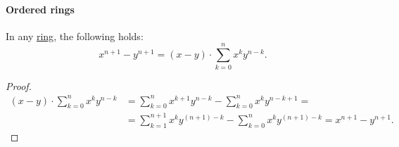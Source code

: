 \paragraph{Ordered rings}

\begin{proposition}\label{thm:xn_minus_yn_factorization}
  In any \hyperref[def:ring]{ring}, the following holds:
  \begin{equation}\label{eq:thm:xn_minus_yn_factorization}
    x^{n + 1} - y^{n + 1} = (x - y) \cdot \sum_{k=0}^n x^k y^{n-k}.
  \end{equation}
\end{proposition}
\begin{proof}
  \begin{align*}
    (x - y) \cdot \sum_{k=0}^n x^k y^{n-k}
    &=
    \sum_{k=0}^n x^{k+1} y^{n-k} - \sum_{k=0}^n x^k y^{n-k+1}
    = \\ &=
    \sum_{k=1}^{n+1} x^k y^{(n+1)-k} - \sum_{k=0}^n x^k y^{(n+1)-k}
    =
    x^{n+1} - y^{n+1}.
  \end{align*}
\end{proof}

